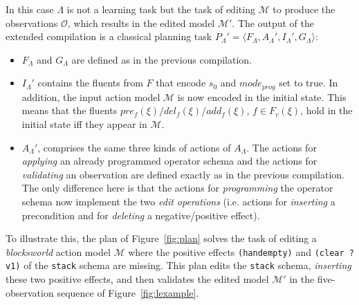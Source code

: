 \documentclass{article}
\newcommand{\tup}[1]{{\langle #1 \rangle}}
\begin{document}
In this case $\Lambda$ is not a learning task but the task of editing $\mathcal{M}$ to produce the observations $\mathcal{O}$, which results in the edited model $\mathcal{M}'$. The output of the extended compilation is a classical planning task $P_{\Lambda}'=\tup{F_{\Lambda},A_{\Lambda}',I_{\Lambda}',G_{\Lambda}}$:

\begin{itemize}
\item $F_{\Lambda}$ and $G_{\Lambda}$ are defined as in the previous compilation.
\item $I_{\Lambda}'$ contains the fluents from $F$ that encode $s_0$ and $mode_{prog}$ set to true. In addition, the input action model $\mathcal{M}$ is now encoded in the initial state. This means that the fluents $pre_f(\xi)/del_f(\xi)/add_f(\xi)$, $f\in F_v(\xi)$, hold in the initial state iff they appear in $\mathcal{M}$.
\item $A_{\Lambda}'$, comprises the same three kinds of actions of $A_{\Lambda}$. The actions for {\em applying} an already programmed operator schema and the actions for {\em validating} an observation are defined exactly as in the previous compilation. The only difference here is that the actions for {\em programming} the operator schema now implement the two {\em edit operations} (i.e. actions for {\em inserting} a precondition and for {\em deleting} a negative/positive effect).
\end{itemize}

To illustrate this, the plan of Figure~\ref{fig:plan} solves the task of editing a \emph{blocksworld} action model $\mathcal{M}$ where the positive effects {\tt\small (handempty)} and {\tt\small (clear ?v1)} of the {\tt\small stack} schema are missing. This plan edits the {\tt\small stack} schema, {\em inserting} these two positive effects, and then validates the edited model $\mathcal{M}'$ in the five-observation sequence of Figure~\ref{fig:lexample}.
\end{document}
